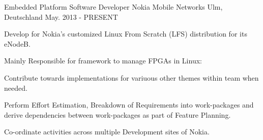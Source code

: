   \cventry
    {Embedded Platform Software Developer} %
    {Nokia Mobile Networks} %
    {Ulm, Deutschland} %
    {May. 2013 - PRESENT} %
    {
      \begin{cvitems} %
      \item {Develop for  Nokia's customized Linux From Scratch (LFS) distribution for its eNodeB.}
      \item {Mainly Responsible for framework to manage FPGAs in Linux:}
        \item {Contribute towards implementations for variuous other themes within team when needed.}
	\item {Perform Effort Estimation, Breakdown of Requirements into work-packages and derive dependencies between work-packages as part of Feature Planning.}
	\item {Co-ordinate activities across multiple Development sites of Nokia.}
      \end{cvitems}
  }
